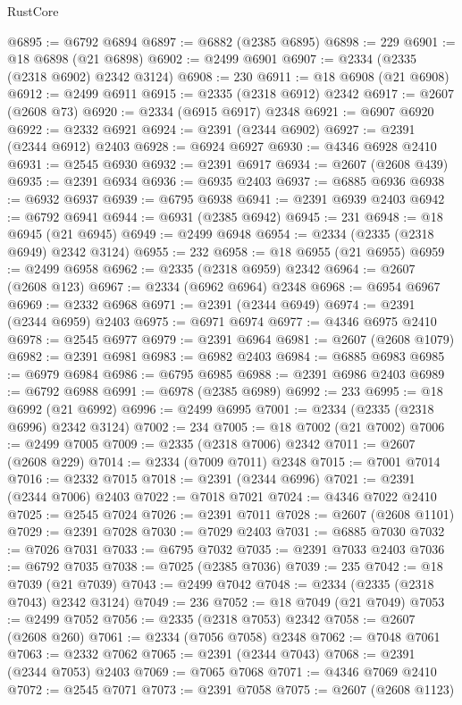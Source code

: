 \begin{lexlean}{RustCore}
\begin{coremodule}
@6895 := @6792 @6894
@6897 := @6882 (@2385 @6895)
@6898 := 229
@6901 := @18 @6898 (@21 @6898)
@6902 := @2499 @6901
@6907 := @2334 (@2335 (@2318 @6902) @2342 @3124)
@6908 := 230
@6911 := @18 @6908 (@21 @6908)
@6912 := @2499 @6911
@6915 := @2335 (@2318 @6912) @2342
@6917 := @2607 (@2608 @73)
@6920 := @2334 (@6915 @6917) @2348
@6921 := @6907 @6920
@6922 := @2332 @6921
@6924 := @2391 (@2344 @6902)
@6927 := @2391 (@2344 @6912) @2403
@6928 := @6924 @6927
@6930 := @4346 @6928 @2410
@6931 := @2545 @6930
@6932 := @2391 @6917
@6934 := @2607 (@2608 @439)
@6935 := @2391 @6934
@6936 := @6935 @2403
@6937 := @6885 @6936
@6938 := @6932 @6937
@6939 := @6795 @6938
@6941 := @2391 @6939 @2403
@6942 := @6792 @6941
@6944 := @6931 (@2385 @6942)
@6945 := 231
@6948 := @18 @6945 (@21 @6945)
@6949 := @2499 @6948
@6954 := @2334 (@2335 (@2318 @6949) @2342 @3124)
@6955 := 232
@6958 := @18 @6955 (@21 @6955)
@6959 := @2499 @6958
@6962 := @2335 (@2318 @6959) @2342
@6964 := @2607 (@2608 @123)
@6967 := @2334 (@6962 @6964) @2348
@6968 := @6954 @6967
@6969 := @2332 @6968
@6971 := @2391 (@2344 @6949)
@6974 := @2391 (@2344 @6959) @2403
@6975 := @6971 @6974
@6977 := @4346 @6975 @2410
@6978 := @2545 @6977
@6979 := @2391 @6964
@6981 := @2607 (@2608 @1079)
@6982 := @2391 @6981
@6983 := @6982 @2403
@6984 := @6885 @6983
@6985 := @6979 @6984
@6986 := @6795 @6985
@6988 := @2391 @6986 @2403
@6989 := @6792 @6988
@6991 := @6978 (@2385 @6989)
@6992 := 233
@6995 := @18 @6992 (@21 @6992)
@6996 := @2499 @6995
@7001 := @2334 (@2335 (@2318 @6996) @2342 @3124)
@7002 := 234
@7005 := @18 @7002 (@21 @7002)
@7006 := @2499 @7005
@7009 := @2335 (@2318 @7006) @2342
@7011 := @2607 (@2608 @229)
@7014 := @2334 (@7009 @7011) @2348
@7015 := @7001 @7014
@7016 := @2332 @7015
@7018 := @2391 (@2344 @6996)
@7021 := @2391 (@2344 @7006) @2403
@7022 := @7018 @7021
@7024 := @4346 @7022 @2410
@7025 := @2545 @7024
@7026 := @2391 @7011
@7028 := @2607 (@2608 @1101)
@7029 := @2391 @7028
@7030 := @7029 @2403
@7031 := @6885 @7030
@7032 := @7026 @7031
@7033 := @6795 @7032
@7035 := @2391 @7033 @2403
@7036 := @6792 @7035
@7038 := @7025 (@2385 @7036)
@7039 := 235
@7042 := @18 @7039 (@21 @7039)
@7043 := @2499 @7042
@7048 := @2334 (@2335 (@2318 @7043) @2342 @3124)
@7049 := 236
@7052 := @18 @7049 (@21 @7049)
@7053 := @2499 @7052
@7056 := @2335 (@2318 @7053) @2342
@7058 := @2607 (@2608 @260)
@7061 := @2334 (@7056 @7058) @2348
@7062 := @7048 @7061
@7063 := @2332 @7062
@7065 := @2391 (@2344 @7043)
@7068 := @2391 (@2344 @7053) @2403
@7069 := @7065 @7068
@7071 := @4346 @7069 @2410
@7072 := @2545 @7071
@7073 := @2391 @7058
@7075 := @2607 (@2608 @1123)

\end{coremodule}
\end{lexlean}
